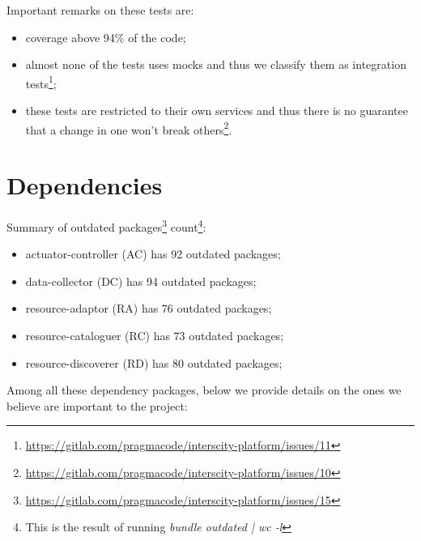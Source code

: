 \documentclass[paper=a4, fontsize=11pt]{scrartcl}
\numberwithin{equation}{section}    %
\numberwithin{figure}{section}      %
\numberwithin{table}{section}        %
\begin{document}
  \vspace{1em}

  Important remarks on these tests are:

  \begin{itemize}
    \item coverage above 94\% of the code;
    \item almost none of the tests uses mocks and thus we classify them as integration tests\footnote{\url{https://gitlab.com/pragmacode/interscity-platform/issues/11}};
    \item these tests are restricted to their own services and thus there is no guarantee that a change in one won't break others\footnote{\url{https://gitlab.com/pragmacode/interscity-platform/issues/10}}.
  \end{itemize}

\section{Dependencies}
\label{sec:dependencies}
  Summary of outdated packages\footnote{\url{https://gitlab.com/pragmacode/interscity-platform/issues/15}} count\footnote{This is the result of running \textit{bundle outdated | wc -l}}:

  \begin{itemize}
    \item actuator-controller (AC) has 92 outdated packages;
    \item data-collector (DC) has 94 outdated packages;
    \item resource-adaptor (RA) has 76 outdated packages;
    \item resource-cataloguer (RC) has 73 outdated packages;
    \item resource-discoverer (RD) has 80 outdated packages;
  \end{itemize}

  Among all these dependency packages, below we provide details on the ones we believe are important to the project:

  \vspace{1em}
\end{document}
